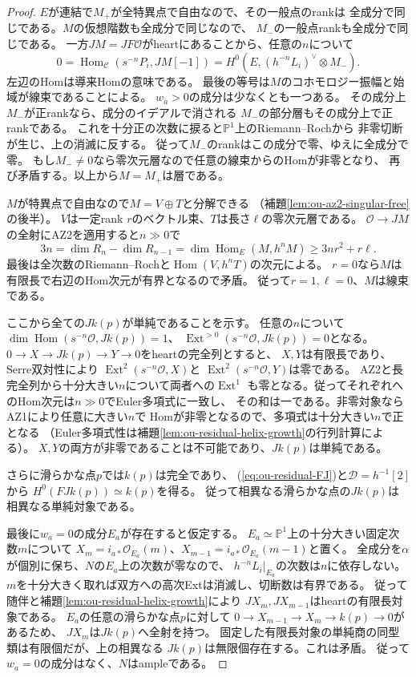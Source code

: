 \begin{proof}
$E$が連結で$M_+$が全特異点で自由なので、その一般点のrankは
全成分で同じである。$M$の仮想階数も全成分で同じなので、
$M_-$の一般点rankも全成分で同じである。
一方$JM=JF\mathcal O$がheartにあることから、任意の$n$について
\[
 0=\operatorname{Hom}_\mathcal C(s^{-n}P_i,JM[-1])
  =H^0(E,(h^{-n}L_i)^\vee\otimes M_-).
\]
左辺のHomは導来Homの意味である。
最後の等号は$M$のコホモロジー振幅と始域が線束であることによる。
$w_a>0$の成分は少なくとも一つある。
その成分上$M_-$が正rankなら、成分のイデアルで消される
$M_-$の部分層もその成分上で正rankである。
これを十分正の次数に捩ると$\mathbb P^1$上のRiemann--Rochから
非零切断が生じ、上の消滅に反する。
従って$M_-$のrankはこの成分で零、ゆえに全成分で零。
もし$M_-\ne0$なら零次元層なので任意の線束からのHomが非零となり、
再び矛盾する。以上から$M=M_+$は層である。

$M$が特異点で自由なので$M=V\oplus T$と分解できる
（補題\ref{lem:ou-az2-singular-free}の後半）。
$V$は一定rank $r$のベクトル束、$T$は長さ$\ell$の零次元層である。
$\mathcal O\to JM$の全射にAZ2を適用すると$n\gg0$で
\[
 3n=\dim R_n-\dim R_{n-1}
 =\dim\operatorname{Hom}_E(M,h^nM)
 \geq 3nr^2+r\ell .
\]
最後は全次数のRiemann--Rochと$\operatorname{Hom}(V,h^nT)$の次元による。
$r=0$なら$M$は有限長で右辺のHom次元が有界となるので矛盾。
従って$r=1,\ell=0$、$M$は線束である。

ここから全ての$Jk(p)$が単純であることを示す。
任意の$n$について
$\dim\operatorname{Hom}(s^{-n}\mathcal O,Jk(p))=1$、
$\operatorname{Ext}^{>0}(s^{-n}\mathcal O,Jk(p))=0$となる。
$0\to X\to Jk(p)\to Y\to0$をheartの完全列とすると、
$X,Y$は有限長であり、Serre双対性により
$\operatorname{Ext}^2(s^{-n}\mathcal O,X)$と
$\operatorname{Ext}^2(s^{-n}\mathcal O,Y)$は零である。
AZ2と長完全列から十分大きい$n$について両者への$\operatorname{Ext}^1$
も零となる。従ってそれぞれへのHom次元は$n\gg0$でEuler多項式に一致し、
その和は一である。非零対象ならAZ1により任意に大きい$n$で
Homが非零となるので、多項式は十分大きい$n$で正となる
（Euler多項式性は補題\ref{lem:ou-residual-helix-growth}の行列計算による）。
$X,Y$の両方が非零であることは不可能であり、$Jk(p)$は単純である。

さらに滑らかな点$p$では$k(p)$は完全であり、
(\ref{eq:ou-residual-FJ})と$\mathcal D=h^{-1}[2]$から
$H^0(FJk(p))\simeq k(p)$を得る。
従って相異なる滑らかな点の$Jk(p)$は相異なる単純対象である。

最後に$w_a=0$の成分$E_a$が存在すると仮定する。
$E_a\simeq\mathbb P^1$上の十分大きい固定次数$m$について
$X_m=i_{a*}\mathcal O_{E_a}(m)$、$X_{m-1}=i_{a*}\mathcal O_{E_a}(m-1)$と置く。
全成分を$\alpha$が個別に保ち、$N$の$E_a$上の次数が零なので、
$h^{-n}L_i|_{E_a}$の次数は$n$に依存しない。
$m$を十分大きく取れば双方への高次Extは消滅し、切断数は有界である。
従って随伴と補題\ref{lem:ou-residual-helix-growth}により
$JX_m,JX_{m-1}$はheartの有限長対象である。
$E_a$の任意の滑らかな点$p$に対して
$0\to X_{m-1}\to X_m\to k(p)\to0$があるため、
$JX_m$は$Jk(p)$へ全射を持つ。
固定した有限長対象の単純商の同型類は有限個だが、上の相異なる
$Jk(p)$は無限個存在する。これは矛盾。
従って$w_a=0$の成分はなく、$N$はampleである。
\end{proof}


